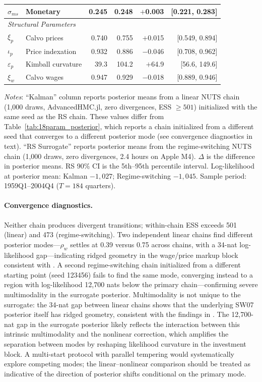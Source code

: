 \documentclass[12pt]{article}
\theoremstyle{plain}
\theoremstyle{definition}
\theoremstyle{remark}
\begin{document}
\begin{table}[htbp]
\begin{tabular}{llrrrr}
$\sigma_{ms}$ & Monetary & 0.245 & 0.248 & $+$0.003 & [0.221, 0.283] \\
\midrule
\multicolumn{6}{l}{\textit{Structural Parameters}} \\
$\xi_p$ & Calvo prices & 0.740 & 0.755 & $+$0.015 & [0.549, 0.894] \\
$\iota_p$ & Price indexation & 0.932 & 0.886 & $-$0.046 & [0.708, 0.962] \\
$\varepsilon_p$ & Kimball curvature & 39.3 & 104.2 & $+$64.9 & [56.6, 149.6] \\
$\xi_w$ & Calvo wages & 0.947 & 0.929 & $-$0.018 & [0.889, 0.946] \\
\bottomrule
\end{tabular}
\smallskip
{\footnotesize \textit{Notes}: ``Kalman'' column reports posterior means from a linear NUTS chain (1,000 draws, AdvancedHMC.jl, zero divergences, ESS $\geq 501$) initialized with the same seed as the RS chain. These values differ from Table~\ref{tab:18param_posterior}, which reports a chain initialized from a different seed that converges to a different posterior mode (see convergence diagnostics in text). ``RS Surrogate'' reports posterior means from the regime-switching NUTS chain (1,000 draws, zero divergences, 2.4 hours on Apple M4). $\Delta$ is the difference in posterior means. RS 90\% CI is the 5th--95th percentile interval. Log-likelihood at posterior mean: Kalman $-1{,}027$; Regime-switching $-1{,}045$. Sample period: 1959Q1--2004Q4 ($T=184$ quarters).}
\end{table}

\paragraph{Convergence diagnostics.} Neither chain produces divergent transitions; within-chain ESS exceeds 501 (linear) and 473 (regime-switching). Two independent linear chains find different posterior modes---$\rho_w$ settles at 0.39 versus 0.75 across chains, with a 34-nat log-likelihood gap---indicating ridged geometry in the wage/price markup block consistent with \citet{herbst2016sequential}. A second regime-switching chain initialized from a different starting point (seed 123456) fails to find the same mode, converging instead to a region with log-likelihood 12,700 nats below the primary chain---confirming severe multimodality in the surrogate posterior. Multimodality is not unique to the surrogate: the 34-nat gap between linear chains shows that the underlying SW07 posterior itself has ridged geometry, consistent with the findings in \citet{herbst2016sequential}. The 12,700-nat gap in the surrogate posterior likely reflects the interaction between this intrinsic multimodality and the nonlinear correction, which amplifies the separation between modes by reshaping likelihood curvature in the investment block. A multi-start protocol with parallel tempering \citep{herbst2019tempered} would systematically explore competing modes; the linear--nonlinear comparison should be treated as indicative of the direction of posterior shifts conditional on the primary mode.
\end{document}
